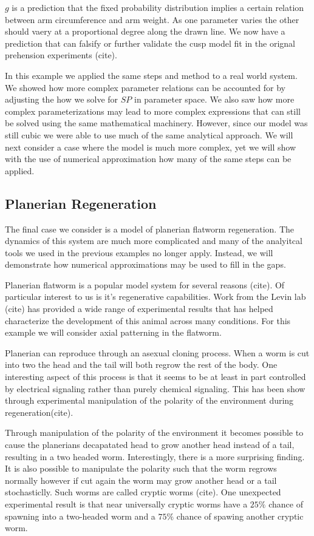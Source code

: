 \documentclass[letterpaper]{article}
\begin{document}
$g$ is a prediction that the fixed probability 
distribution implies a certain
relation between arm circumference and arm weight. As one parameter varies 
the other should vaery at a proportional degree along the drawn line.
We now have a prediction that can falsify or 
further validate the cusp model fit in the 
orignal prehension experiments (cite).

In this example we applied the same steps and method to a real world system. 
We showed how
more complex parameter relations can be accounted for by adjusting the 
how we solve for $SP$ in parameter space. 
We also saw how more complex parameterizations may lead to more complex expressions
that can still be solved using the same mathematical machinery.
However, since our model 
was still cubic we were able to use much of 
the same analytical 
approach. We will next consider a case where the model is much more 
complex, yet we will 
show with the use of numerical approximation how many of the same 
steps can be applied.

\subsection{Planerian Regeneration}

The final case we consider is a model of planerian flatworm regeneration. The dynamics 
of this system are much more complicated and many of the analyitcal tools we used
in the previous examples no longer apply. Instead, we will demonstrate how numerical
approximations may be used to fill in the gaps.

Planerian flatworm is a popular model system for several reasons (cite). Of particular
interest to us is it's regenerative capabilities. Work from the Levin lab (cite) has
provided a wide range of experimental results that has helped characterize the development
of this animal across many conditions. For this example we will consider axial patterning
in the flatworm.

Planerian can reproduce through an asexual cloning process. When a worm is cut into two
the head and the tail will both regrow the rest of the body. One interesting aspect of
this process is that it seems to be at least in part controlled by electrical signaling
rather than purely chemical signaling. This has been show through experimental manipulation
of the polarity of the environment during regeneration(cite).

Through manipulation of the polarity of the environment it becomes possible to cause
the planerians decapatated head to grow another head instead of a tail, resulting
in a two headed worm. Interestingly, there is a more surprising finding. It is also
possible to manipulate the polarity such that the worm regrows normally however if 
cut again the worm may grow another head or a tail stochasticlly. Such worms are 
called cryptic worms (cite). One unexpected experimental result is that near universally
cryptic worms have a $25\%$ chance of spawning into a two-headed worm and a 
$75\%$ chance 
of spawing another cryptic worm.
\end{document}
